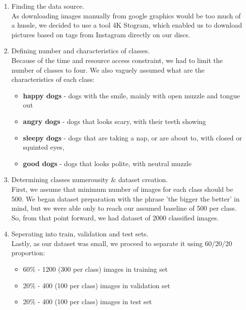\documentclass[11pt]{diazessay} %
\begin{document}
\begin{enumerate}
	\item Finding the data source. \\
	As downloading images manually from google graphics would be too much of a hussle, we decided to use a tool 4K Stogram, which enabled us to download pictures based on tags from Instagram directly on our discs.
	\\
	\item Defining number and characteristics of classes. \\ 
	Because of the time and resource access constraint, we had to limit the number of classes to four. We also vaguely assumed what are the characteristics of each class:
	\begin{itemize}
		\item \textbf{happy dogs} - dogs with the smile, mainly with open muzzle and tongue out
		\item \textbf{angry dogs} - dogs that looks scary, with their teeth showing
		\item \textbf{sleepy dogs} - dogs that are taking a nap, or are about to, with closed or squinted eyes,
		\item \textbf{good dogs} - dogs that looks polite, with neutral muzzle \\
	\end{itemize} 
	\item Determining classes numerousity \& dataset creation. \\ 
	First, we assume that minimum number of images for each class should be 500. We began dataset preparation with the phrase 'the bigger the better' in mind, but we were able only to reach our assumed baseline of 500 per class.
	So, from that point forward, we had dataset of 2000 classified images.\\
	\item Seperating into train, validation and test sets.\\ 
	Lastly, as our dataset was small, we proceed to separate it using 60/20/20 proportion:
	\begin{itemize}
		\item 60\% - 1200 (300 per class) images in training set
		\item 20\% - 400 (100 per class) images in validation set
		\item 20\% - 400 (100 per class) images in test set
	\end{itemize}
	
\end{enumerate}
\end{document}

